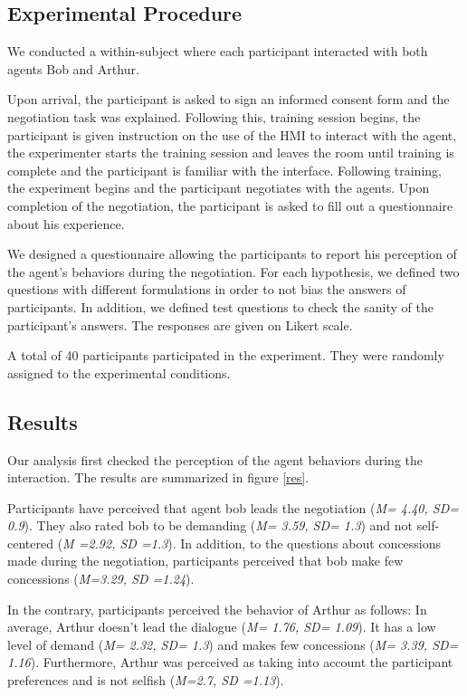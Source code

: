 \documentclass[runningheads,a4paper]{llncs}
\begin{document}
		\subsection{Experimental Procedure}
		We conducted a within-subject where each participant interacted with both  agents Bob and Arthur.
		
		Upon arrival, the participant is asked to sign an informed consent form and the negotiation task was explained. Following this, training session begins, the participant is given instruction on the use of the HMI to interact with the agent, the experimenter starts the training session and leaves the room until training is complete and the participant is familiar with the interface. Following training, the experiment begins and the participant negotiates with the agents. Upon completion of the negotiation, the participant is asked to fill out a questionnaire about his experience.
		
		We designed a questionnaire allowing the participants to report his perception of the agent's behaviors during the negotiation. For each hypothesis, we defined two questions with different formulations in order to not bias the answers of participants. In addition, we defined test questions to check the sanity of the participant's answers. The responses are given on Likert scale.

	
		A total of 40 participants participated in the experiment. They were randomly assigned to the experimental conditions.%
		
		\subsection{Results}
		
		
		Our analysis first checked the perception of the agent behaviors during the interaction. The results are summarized in figure \ref{res}.
		
		Participants have perceived that agent bob leads the negotiation (\emph{M= 4.40, SD= 0.9}). They also rated bob to be demanding (\emph{M= 3.59, SD= 1.3}) and not self-centered (\emph{M =2.92, SD =1.3}). In addition, to the questions about concessions made during the negotiation, participants perceived that bob make few concessions (\emph{M=3.29, SD =1.24}).
		
		In the contrary, participants perceived the behavior of Arthur as follows: In average, Arthur doesn't lead the dialogue (\emph{M= 1.76, SD= 1.09}). It has a low level of demand (\emph{M= 2.32, SD= 1.3}) and makes few concessions (\emph{M= 3.39, SD= 1.16}). Furthermore, Arthur was perceived as taking into account the participant preferences and is not selfish (\emph{M=2.7, SD =1.13}).
		
\end{document}
